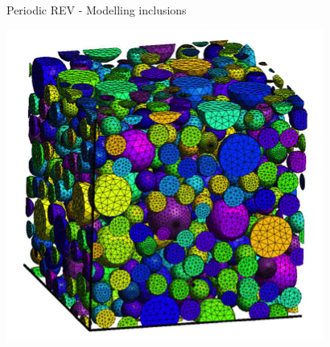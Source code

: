 \documentclass{beamer}
\begin{document}
\begin{frame}{Periodic
    REV - Modelling inclusions}
\begin{textblock}{.2}
\includegraphics[width=\textwidth]{img/polydisperse.png}
\end{textblock}
\end{frame}
\end{document}
